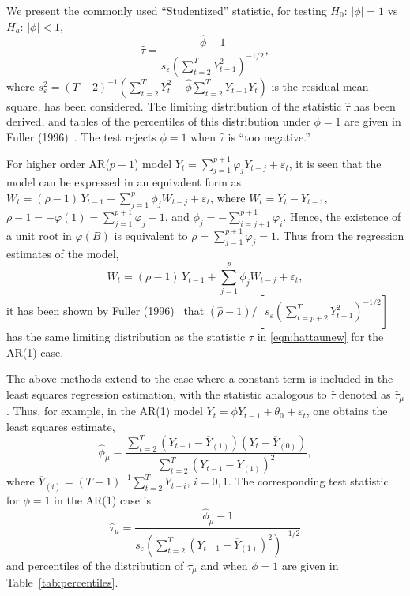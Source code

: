 We present the commonly used ``Studentized'' statistic, for testing $H_0: \, \lvert \phi \rvert=1$ vs $H_a: \, \lvert \phi \rvert < 1$,
	\begin{equation} \label{eqn:hattaunew}
	\hat{\tau} = \dfrac{\hat{\phi} - 1}{s_{\varepsilon} \left( \sum_{t=2}^T Y_{t-1}^2 \right)^{-1/2}},
	\end{equation}
where $s_\varepsilon^2 = (T - 2)^{-1} (\sum_{t=2}^T Y_t^2 - \hat{\phi} \sum_{t=2}^T Y_{t-1} Y_t)$ is the residual mean square, has been considered. The limiting distribution of the statistic $\hat{\tau}$ has been derived, and tables of the percentiles of this distribution under $\phi = 1$ are given in Fuller (1996)~\cite{fuller1996}. The test rejects $\phi = 1$ when $\hat{\tau}$ is ``too negative.''


For higher order AR($p+1$) model $Y_t = \sum_{j=1}^{p+1}\varphi_j Y_{t-j} + \varepsilon_t$, it is seen that the model can be expressed in an equivalent form as $W_t = (\rho - 1)\, Y_{t-1} + \sum_{j=1}^p \phi_jW_{t-j} + \varepsilon_t$, where $W_t = Y_t - Y_{t-1}$, $\rho - 1 = -\varphi(1) = \sum_{j=1}^{p+1} \varphi_j - 1$, and $\phi_j = -\sum_{i=j+1}^{p+1} \varphi_i$. Hence, the existence of a unit root in $\varphi(B)$ is equivalent to $\rho = \sum_{j=1}^{p+1} \varphi_j = 1$. Thus from the regression estimates of the model, 
	\begin{equation} \label{eqn:wtnew}
	W_t  = (\rho - 1)\, Y_{t-1} + \sum_{j=1}^p \phi_j W_{t-j} + \varepsilon_t ,
	\end{equation}
it has been shown by Fuller (1996)~\cite[Chapter 10]{fuller1996} that $(\hat{\rho} - 1)/[s_\varepsilon(\sum_{t=p+2}^T Y_{t-1}^2)^{-1/2}]$ has the same limiting distribution as the statistic $\hat{\tau}$ in \eqref{eqn:hattaunew} for the AR(1) case.


The above methods extend to the case where a constant term is included in the least squares regression estimation, with the statistic analogous to $\hat{\tau}$ denoted as $\hat{\tau}_\mu$. Thus, for example, in the AR(1) model $Y_t = \phi Y_{t-1} + \theta_0 + \varepsilon_t$, one obtains the least squares estimate,
	\begin{equation} \label{eqn:hatphinewest}
	\widehat{\phi}_{\mu} = \dfrac{\sum_{t=2}^T(Y_{t-1} - \overline{Y}_{(1)})(Y_t - \overline{Y}_{(0)})}{\sum_{t=2}^T(Y_{t-1} - \overline{Y}_{(1)})^2},
	\end{equation}
where $\overline{Y}_{(i)} = (T - 1)^{-1}\sum_{t=2}^TY_{t-i}$, $i = 0,1$. The corresponding test statistic for $\phi = 1$ in the AR(1) case is
	\begin{equation} \label{eqn:anotherhattau}
	\hat{\tau}_\mu = \dfrac{\widehat{\phi}_\mu - 1}{s_{\varepsilon} \left( \sum_{t=2}^T(Y_{t-1} - \overline{Y}_{(1)})^2 \right)^{-1/2}}
	\end{equation}
and percentiles of the distribution of $\hat{\tau}_\mu$ and when $\phi = 1$ are given in Table~\ref{tab:percentiles}.


